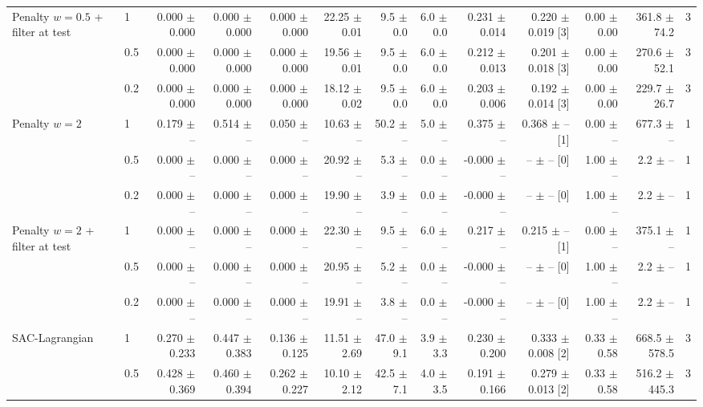 {\begin{tabular}{llrrrrrrrrrrr}
\addlinespace
Penalty $w{=}0.5$ + filter at test & 1 & 0.000 $\pm$ 0.000 & 0.000 $\pm$ 0.000 & 0.000 $\pm$ 0.000 & 22.25 $\pm$ 0.01 & 9.5 $\pm$ 0.0 & 6.0 $\pm$ 0.0 & 0.231 $\pm$ 0.014 & 0.220 $\pm$ 0.019 [3] & 0.00 $\pm$ 0.00 & 361.8 $\pm$ 74.2 & 3 \\
 & 0.5 & 0.000 $\pm$ 0.000 & 0.000 $\pm$ 0.000 & 0.000 $\pm$ 0.000 & 19.56 $\pm$ 0.01 & 9.5 $\pm$ 0.0 & 6.0 $\pm$ 0.0 & 0.212 $\pm$ 0.013 & 0.201 $\pm$ 0.018 [3] & 0.00 $\pm$ 0.00 & 270.6 $\pm$ 52.1 & 3 \\
 & 0.2 & 0.000 $\pm$ 0.000 & 0.000 $\pm$ 0.000 & 0.000 $\pm$ 0.000 & 18.12 $\pm$ 0.02 & 9.5 $\pm$ 0.0 & 6.0 $\pm$ 0.0 & 0.203 $\pm$ 0.006 & 0.192 $\pm$ 0.014 [3] & 0.00 $\pm$ 0.00 & 229.7 $\pm$ 26.7 & 3 \\
\addlinespace
Penalty $w{=}2$ & 1 & 0.179 $\pm$ -- & 0.514 $\pm$ -- & 0.050 $\pm$ -- & 10.63 $\pm$ -- & 50.2 $\pm$ -- & 5.0 $\pm$ -- & 0.375 $\pm$ -- & 0.368 $\pm$ -- [1] & 0.00 $\pm$ -- & 677.3 $\pm$ -- & 1 \\
 & 0.5 & 0.000 $\pm$ -- & 0.000 $\pm$ -- & 0.000 $\pm$ -- & 20.92 $\pm$ -- & 5.3 $\pm$ -- & 0.0 $\pm$ -- & -0.000 $\pm$ -- & -- $\pm$ -- [0] & 1.00 $\pm$ -- & 2.2 $\pm$ -- & 1 \\
 & 0.2 & 0.000 $\pm$ -- & 0.000 $\pm$ -- & 0.000 $\pm$ -- & 19.90 $\pm$ -- & 3.9 $\pm$ -- & 0.0 $\pm$ -- & -0.000 $\pm$ -- & -- $\pm$ -- [0] & 1.00 $\pm$ -- & 2.2 $\pm$ -- & 1 \\
\addlinespace
Penalty $w{=}2$ + filter at test & 1 & 0.000 $\pm$ -- & 0.000 $\pm$ -- & 0.000 $\pm$ -- & 22.30 $\pm$ -- & 9.5 $\pm$ -- & 6.0 $\pm$ -- & 0.217 $\pm$ -- & 0.215 $\pm$ -- [1] & 0.00 $\pm$ -- & 375.1 $\pm$ -- & 1 \\
 & 0.5 & 0.000 $\pm$ -- & 0.000 $\pm$ -- & 0.000 $\pm$ -- & 20.95 $\pm$ -- & 5.2 $\pm$ -- & 0.0 $\pm$ -- & -0.000 $\pm$ -- & -- $\pm$ -- [0] & 1.00 $\pm$ -- & 2.2 $\pm$ -- & 1 \\
 & 0.2 & 0.000 $\pm$ -- & 0.000 $\pm$ -- & 0.000 $\pm$ -- & 19.91 $\pm$ -- & 3.8 $\pm$ -- & 0.0 $\pm$ -- & -0.000 $\pm$ -- & -- $\pm$ -- [0] & 1.00 $\pm$ -- & 2.2 $\pm$ -- & 1 \\
\addlinespace
SAC-Lagrangian & 1 & 0.270 $\pm$ 0.233 & 0.447 $\pm$ 0.383 & 0.136 $\pm$ 0.125 & 11.51 $\pm$ 2.69 & 47.0 $\pm$ 9.1 & 3.9 $\pm$ 3.3 & 0.230 $\pm$ 0.200 & 0.333 $\pm$ 0.008 [2] & 0.33 $\pm$ 0.58 & 668.5 $\pm$ 578.5 & 3 \\
 & 0.5 & 0.428 $\pm$ 0.369 & 0.460 $\pm$ 0.394 & 0.262 $\pm$ 0.227 & 10.10 $\pm$ 2.12 & 42.5 $\pm$ 7.1 & 4.0 $\pm$ 3.5 & 0.191 $\pm$ 0.166 & 0.279 $\pm$ 0.013 [2] & 0.33 $\pm$ 0.58 & 516.2 $\pm$ 445.3 & 3 \\

\end{tabular}}

